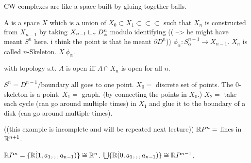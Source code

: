 \documentclass[11pt,leqno,oneside]{amsart}
\numberwithin{thm}{section}
\renewcommand{\d}{\partial}
\begin{document}
CW complexes are like a space built by gluing together balls.
\begin{defn}
  A  is a space $X$ which is a union of $X_0 \subset X_1 \subset \subset \subset$ such that $X_n$ is constructed from $X_{n-1}$ by taking $X_{n-1} \sqcup_{\alpha} D_{\alpha}^n$ modulo identifying (( --> he might have meant $S^n$ here.  i think the point is that he meant $\d D^n$)) $\phi_\alpha \colon S_\alpha^{n-1} \to X_{n-1}$.  $X_n$ is called $n$-Skeleton.  $X ~ \phi_\alpha$.

  with topology s.t. $A$ is open iff $A \cap X_n$ is open for all $n$.
\end{defn}
\begin{example}
  $S^n = D^{n-1}/\text{boundary}$ all goes to one point.
  $X_0 =$ discrete set of points.  The $0$-skeleton is a point.
  $X_1 =$ graph. (by connecting the points in $X_0$.)
  $X_2 =$ take each cycle (can go around multiple times) in $X_1$ and glue it to the boundary of a disk (can go around multiple times).
\end{example}
\begin{example}
  ((this example is incomplete and will be repeated next lecture))
  ${\mathbb R} P^n =$ lines in ${\mathbb R}^{n+1}$.

  ${\mathbb R} P^n = \{ {\mathbb R} \dot (1, a_1,,, a_{n-1})\} \mathrel{\cong} {\mathbb R}^{n}$.
  $\bigcup \{ {\mathbb R} \dot (0, a_1,,, a_{n-1})\} \mathrel{\cong} {\mathbb R} P^{n-1}$.
\end{example}


\begin{bibdiv}
\begin{biblist}
\end{biblist}
\end{bibdiv}
\end{document}
